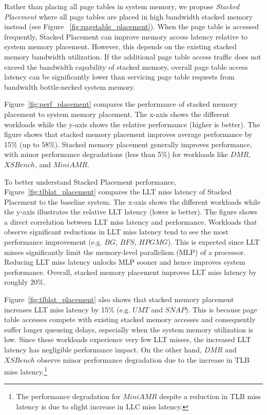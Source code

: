 \noindent Rather than placing all page tables in system memory, we
propose {\em Stacked Placement} where all page tables are placed in
high bandwidth stacked memory instead (see Figure
~\ref{fig:pagetable_placement}). When the page table is accessed
frequently, Stacked Placement can improve memory access latency
relative to system memory placement. However, this depends on the
existing stacked memory bandwidth utilization. If the additional page
table access traffic does not exceed the bandwidth capability of
stacked memory, overall page table access latency can be significantly
lower than servicing page table requests from bandwidth bottle-necked
system memory.

Figure~\ref{fig:perf_placement} compares the performance of stacked
memory placement to system memory placement. The x-axis shows the
different workloads while the y-axis shows the relative performance
(higher is better). The figure shows that stacked memory
placement improves average performance by 15\% (up to 58\%). Stacked
memory placement generally improves performance, with minor
performance degradations (less than 5\%) for workloads like $DMR$,
$XSBench$, and $MiniAMR$.

To better understand Stacked Placement performance,
Figure~\ref{fig:tlblat_placement} compares the LLT miss latency of
Stacked Placement to the baseline system. The x-axis shows the
different workloads while the y-axis illustrates the relative LLT
latency (lower is better). The figure shows a direct correlation
between LLT miss latency and performance. Workloads that observe
significant reductions in LLT miss latency tend to see the most
performance improvement (e.g. $BG$, $BFS$, $HPGMG$). This is expected
since LLT misses significantly limit the memory-level parallelism
(MLP) of a processor. Reducing LLT miss latency unlocks MLP sooner and
hence improves system performance. Overall, stacked memory placement
improves LLT miss latency by roughly 20\%.

Figure~\ref{fig:tlblat_placement} also shows that stacked memory
placement increases LLT miss latency by 15\% (e.g. $UMT$ and
$SNAP$). This is because page table accesses compete with existing
stacked memory accesses and consequently suffer longer queueing
delays, especially when the system memory utilization is low. Since
these workloads experience very few LLT misses, the increased LLT
latency has negligible performance impact.  On the other hand, $DMR$
and $XSBench$ observe minor performance degradation due to the
increase in TLB miss latency.\footnote{\small{The performance
    degradation for $MiniAMR$ despite a reduction in TLB miss latency
    is due to slight increase in LLC miss latency.}}

